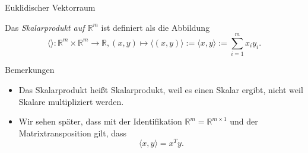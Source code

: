 \documentclass[
  8pt,
  ignorenonframetext,
]{beamer}
\providecommand{\tightlist}{%
  \setlength{\itemsep}{0pt}\setlength{\parskip}{0pt}}
\begin{document}
\begin{frame}{Euklidischer Vektorraum}
\protect\hypertarget{euklidischer-vektorraum}{}
\small
\begin{definition}
Das \textit{Skalarprodukt auf $\mathbb{R}^m$} ist definiert als die Abbildung
\begin{equation}
\langle \rangle : \mathbb{R}^m \times \mathbb{R}^m \to \mathbb{R},
(x,y) \mapsto \langle (x,y) \rangle := \langle x,y \rangle := \sum_{i=1}^m x_i y_i.
\end{equation}
\end{definition}

\footnotesize

Bemerkungen

\begin{itemize}
\tightlist
\item
  \justifying Das Skalarprodukt heißt Skalarprodukt, weil es einen
  Skalar ergibt, nicht weil Skalare multipliziert werden.
\item
  Wir sehen später, dass mit der Identifikation
  \(\mathbb{R}^m = \mathbb{R}^{m \times 1}\) und der Matrixtransposition
  gilt, dass \begin{equation}
  \langle x,y \rangle = x^Ty.
  \end{equation}
\end{itemize}
\end{frame}
\end{document}
